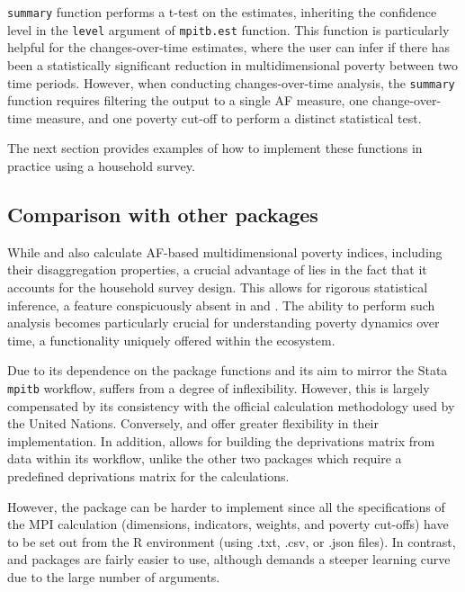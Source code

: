 \texttt{summary} function performs a t-test on the estimates, inheriting the confidence level in the \texttt{level} argument of \texttt{mpitb.est} function. This function is particularly helpful for the changes-over-time estimates, where the user can infer if there has been a statistically significant reduction in multidimensional poverty between two time periods. However, when conducting changes-over-time analysis, the \texttt{summary} function requires filtering the output to a single AF measure, one change-over-time measure, and one poverty cut-off to perform a distinct statistical test.

The next section provides examples of how to implement these functions in practice using a household survey.

\subsection{Comparison with other packages}\label{comparison-with-other-packages}

While  and  also calculate AF-based multidimensional poverty indices, including their disaggregation properties, a crucial advantage of  lies in the fact that it accounts for the household survey design. This allows for rigorous statistical inference, a feature conspicuously absent in  and . The ability to perform such analysis becomes particularly crucial for understanding poverty dynamics over time, a functionality uniquely offered within the  ecosystem.

Due to its dependence on the  package functions and its aim to mirror the Stata \texttt{mpitb} workflow,  suffers from a degree of inflexibility. However, this is largely compensated by its consistency with the official calculation methodology used by the United Nations. Conversely,  and  offer greater flexibility in their implementation. In addition,  allows for building the deprivations matrix from data within its workflow, unlike the other two packages which require a predefined deprivations matrix for the calculations.

However, the  package can be harder to implement since all the specifications of the MPI calculation (dimensions, indicators, weights, and poverty cut-offs) have to be set out from the R environment (using .txt, .csv, or .json files). In contrast,  and  packages are fairly easier to use, although  demands a steeper learning curve due to the large number of arguments.


